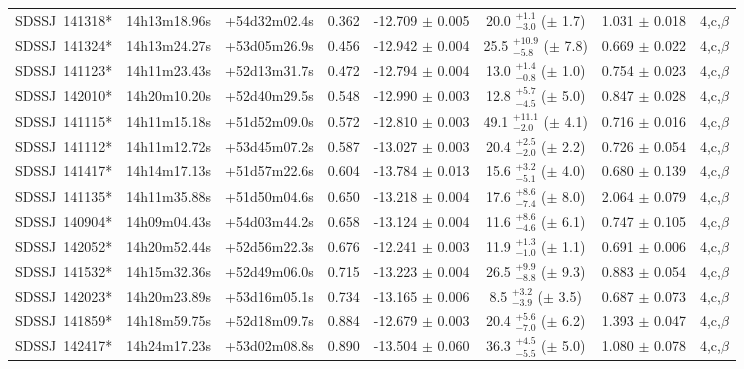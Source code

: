 \documentclass[a4paper,fleqn,usenatbib]{mnras}
\begin{document}
\begin{appendix}
\begin{longtable}{cccccccc}
SDSSJ~141318* & 14h13m18.96s & +54d32m02.4s & 0.362 & -12.709 $\pm$ 0.005 & 20.0 $_{-3.0}^{+1.1}$ ($\pm$ 1.7) &    1.031 $\pm$ 0.018 & 4,c,$\beta$ \\
SDSSJ~141324* & 14h13m24.27s & +53d05m26.9s & 0.456 & -12.942 $\pm$ 0.004 & 25.5 $_{-5.8}^{+10.9}$ ($\pm$ 7.8) &    0.669 $\pm$ 0.022 & 4,c,$\beta$ \\
SDSSJ~141123* & 14h11m23.43s & +52d13m31.7s & 0.472 & -12.794 $\pm$ 0.004 & 13.0 $_{-0.8}^{+1.4}$ ($\pm$ 1.0) &    0.754 $\pm$ 0.023 & 4,c,$\beta$ \\
SDSSJ~142010* & 14h20m10.20s & +52d40m29.5s & 0.548 & -12.990 $\pm$ 0.003 & 12.8 $_{-4.5}^{+5.7}$ ($\pm$ 5.0) &    0.847 $\pm$ 0.028 & 4,c,$\beta$ \\
SDSSJ~141115* & 14h11m15.18s & +51d52m09.0s & 0.572 & -12.810 $\pm$ 0.003 & 49.1 $_{-2.0}^{+11.1}$ ($\pm$ 4.1) &    0.716 $\pm$ 0.016 & 4,c,$\beta$ \\
SDSSJ~141112* & 14h11m12.72s & +53d45m07.2s & 0.587 & -13.027 $\pm$ 0.003 & 20.4 $_{-2.0}^{+2.5}$ ($\pm$ 2.2) &    0.726 $\pm$ 0.054 & 4,c,$\beta$ \\
SDSSJ~141417* & 14h14m17.13s & +51d57m22.6s & 0.604 & -13.784 $\pm$ 0.013 & 15.6 $_{-5.1}^{+3.2}$ ($\pm$ 4.0) &    0.680 $\pm$ 0.139 & 4,c,$\beta$ \\
SDSSJ~141135* & 14h11m35.88s & +51d50m04.6s & 0.650 & -13.218 $\pm$ 0.004 & 17.6 $_{-7.4}^{+8.6}$ ($\pm$ 8.0) &    2.064 $\pm$ 0.079 & 4,c,$\beta$ \\
SDSSJ~140904* & 14h09m04.43s & +54d03m44.2s & 0.658 & -13.124 $\pm$ 0.004 & 11.6 $_{-4.6}^{+8.6}$ ($\pm$ 6.1) &    0.747 $\pm$ 0.105 & 4,c,$\beta$ \\
SDSSJ~142052* & 14h20m52.44s & +52d56m22.3s & 0.676 & -12.241 $\pm$ 0.003 & 11.9 $_{-1.0}^{+1.3}$ ($\pm$ 1.1) &    0.691 $\pm$ 0.006 & 4,c,$\beta$ \\
SDSSJ~141532* & 14h15m32.36s & +52d49m06.0s & 0.715 & -13.223 $\pm$ 0.004 & 26.5 $_{-8.8}^{+9.9}$ ($\pm$ 9.3) &    0.883 $\pm$ 0.054 & 4,c,$\beta$ \\
SDSSJ~142023* & 14h20m23.89s & +53d16m05.1s & 0.734 & -13.165 $\pm$ 0.006 & 8.5 $_{-3.9}^{+3.2}$ ($\pm$ 3.5) &    0.687 $\pm$ 0.073 & 4,c,$\beta$ \\
SDSSJ~141859* & 14h18m59.75s & +52d18m09.7s & 0.884 & -12.679 $\pm$ 0.003 & 20.4 $_{-7.0}^{+5.6}$ ($\pm$ 6.2) &    1.393 $\pm$ 0.047 & 4,c,$\beta$ \\
SDSSJ~142417* & 14h24m17.23s & +53d02m08.8s & 0.890 & -13.504 $\pm$ 0.060 & 36.3 $_{-5.5}^{+4.5}$ ($\pm$ 5.0) &    1.080 $\pm$ 0.078 & 4,c,$\beta$ \\

\end{longtable}
\end{appendix}
\end{document}
